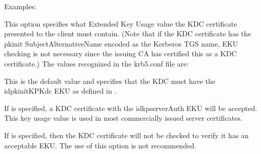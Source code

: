 \documentclass[letterpaper,10pt,english]{sphinxmanual}
\begin{document}
\begin{description}
\sphinxAtStartPar
Examples:

\begin{sphinxVerbatim}[commandchars=\\\{\}]
  
  
  
\end{sphinxVerbatim}

\sphinxAtStartPar
This option specifies what Extended Key Usage value the KDC
certificate presented to the client must contain.  (Note that if
the KDC certificate has the pkinit SubjectAlternativeName encoded
as the Kerberos TGS name, EKU checking is not necessary since the
issuing CA has certified this as a KDC certificate.)  The values
recognized in the krb5.conf file are:
\begin{description}
\sphinxAtStartPar
This is the default value and specifies that the KDC must have
the id\sphinxhyphen{}pkinit\sphinxhyphen{}KPKdc EKU as defined in .

\sphinxAtStartPar
If  is specified, a KDC certificate with the
id\sphinxhyphen{}kp\sphinxhyphen{}serverAuth EKU will be accepted.  This key usage value
is used in most commercially issued server certificates.

\sphinxAtStartPar
If  is specified, then the KDC certificate will not be
checked to verify it has an acceptable EKU.  The use of this
option is not recommended.

\end{description}


\end{description}
\end{document}
